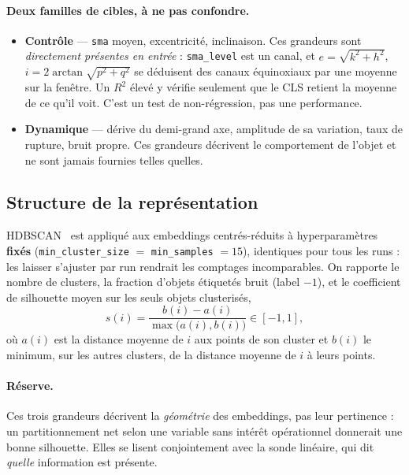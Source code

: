 \documentclass{article}
\begin{document}
\paragraph{Deux familles de cibles, à ne pas confondre.}
\begin{itemize}
    \item \textbf{Contrôle} --- \texttt{sma} moyen, excentricité, inclinaison. Ces grandeurs sont \emph{directement présentes en entrée} : \texttt{sma\_level} est un canal, et $e = \sqrt{k^2+h^2}$, $i = 2\arctan\sqrt{p^2+q^2}$ se déduisent des canaux équinoxiaux par une moyenne sur la fenêtre. Un $R^2$ élevé y vérifie seulement que le CLS retient la moyenne de ce qu'il voit. C'est un test de non-régression, pas une performance.
    \item \textbf{Dynamique} --- dérive du demi-grand axe, amplitude de sa variation, taux de rupture, bruit propre. Ces grandeurs décrivent le comportement de l'objet et ne sont jamais fournies telles quelles.
\end{itemize}

\subsection{Structure de la représentation}

HDBSCAN~\cite{campello2013} est appliqué aux embeddings centrés-réduits à hyperparamètres \textbf{fixés} (\texttt{min\_cluster\_size} $=$ \texttt{min\_samples} $= 15$), identiques pour tous les runs : les laisser s'ajuster par run rendrait les comptages incomparables. On rapporte le nombre de clusters, la fraction d'objets étiquetés bruit (label $-1$), et le coefficient de silhouette moyen sur les seuls objets clusterisés,
\begin{equation}
s(i) = \frac{b(i)-a(i)}{\max\bigl(a(i),b(i)\bigr)} \in [-1,1],
\end{equation}
où $a(i)$ est la distance moyenne de $i$ aux points de son cluster et $b(i)$ le minimum, sur les autres clusters, de la distance moyenne de $i$ à leurs points.

\paragraph{Réserve.} Ces trois grandeurs décrivent la \emph{géométrie} des embeddings, pas leur pertinence : un partitionnement net selon une variable sans intérêt opérationnel donnerait une bonne silhouette. Elles se lisent conjointement avec la sonde linéaire, qui dit \emph{quelle} information est présente.
\end{document}
